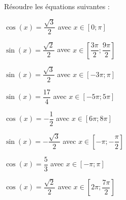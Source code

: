 \documentclass[11pt,a4paper]{article}  %
\begin{document}
Résoudre les équations suivantes : 
\begin{enumMet}
	\item $\cos(x)=\dfrac{\sqrt{3}}{2}$ avec $x\in \left[0;\pi\right]$
	\item $\sin(x)=\dfrac{\sqrt{2}}{2}$ avec $x\in \left[\dfrac{3\pi}{2};\dfrac{9\pi}{2}\right]$
	\item $\sin(x)=\dfrac{\sqrt{3}}{2}$ avec $x\in \left[-3\pi;\pi\right]$
	\item $\sin(x)=\dfrac{17}{4}$ avec $x\in \left[-5\pi;5\pi\right]$
	\item $\cos(x)=-\dfrac{1}{2}$ avec $x\in \left[6\pi;8\pi\right]$
	\item $\sin(x)=-\dfrac{\sqrt{3}}{2}$ avec $x\in \left[-\pi;-\dfrac{\pi}{2}\right]$
	\item $\cos(x)=\dfrac{5}{3}$ avec $x\in \left[-\pi;\pi\right]$
	\item $\cos(x)=\dfrac{\sqrt{2}}{2}$ avec $x\in \left[2\pi;\dfrac{7\pi}{2}\right]$
\end{enumMet}
\end{document}
